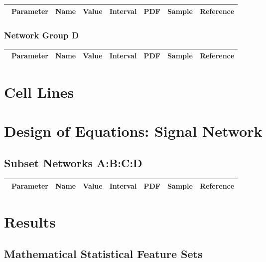 \documentclass[preprint, 8pt]{elsarticle}
\theoremstyle{definition}
\begin{document}
\begin{table}[H]\centering
\begin{tabular}{p{1cm}p{1cm}p{1cm}p{1cm}p{1cm}p{1cm}p{4cm}}\
Parameter & Name & Value & Interval & PDF & Sample & Reference \\
\hline
\hline
\end{tabular}
\end{table}

\subsubsection{Network Group D}

\begin{table}[H]\centering
\begin{tabular}{p{1cm}p{1cm}p{1cm}p{1cm}p{1cm}p{1cm}p{4cm}}\
Parameter & Name & Value & Interval & PDF & Sample & Reference \\
\hline
\hline
\end{tabular}
\end{table}

\section{Cell Lines}
\section{Design of Equations: Signal Network}
\subsection{Subset Networks A:B:C:D}

\begin{table}[H]\centering
\begin{tabular}{p{1cm}p{1cm}p{1cm}p{1cm}p{1cm}p{1cm}p{4cm}}\
Parameter & Name & Value & Interval & PDF & Sample & Reference \\
\hline
\hline
\end{tabular}
\end{table}

\section{Results}

\subsection{Mathematical Statistical Feature Sets}
\end{document}
